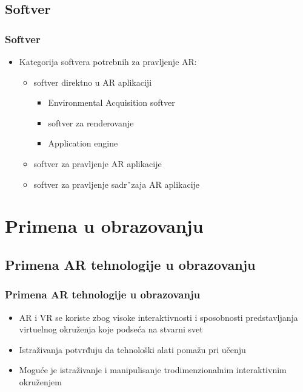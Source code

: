 \documentclass[9pt]{beamer}
\begin{document}
\subsection{Softver}
	\begin{frame}
 \frametitle{Softver}
        \begin{itemize}
            \setlength\itemsep{1.5em}
                \item Kategorija softvera potrebnih za pravljenje AR:
                \begin{itemize}
                \setlength\itemsep{1.5em}
                    \item softver direktno u AR aplikaciji
                    \begin{itemize}
                        \item Environmental Acquisition softver 
                        \item softver za renderovanje
                        \item Application engine
                    \end{itemize}
                    \item softver za pravljenje AR aplikacije
                    \item softver za pravljenje sadrˇzaja AR aplikacije
                \end{itemize}
        \end{itemize}
            
	\end{frame}
 
\section{Primena u obrazovanju}
\subsection{Primena AR  tehnologije u obrazovanju}
	\begin{frame} 
 \frametitle{Primena AR  tehnologije u obrazovanju}
    \begin{itemize}
    \setlength\itemsep{1.5em}
            \item AR i VR se koriste zbog visoke interaktivnosti i sposobnosti predstavljanja virtuelnog okruženja koje podseća na stvarni svet
            \item Istraživanja potvrđuju da tehnološki alati pomažu pri učenju
            \item Moguće je istraživanje i manipulisanje trodimenzionalnim interaktivnim okruženjem 
    \end{itemize}
 
	\end{frame}
\end{document}
